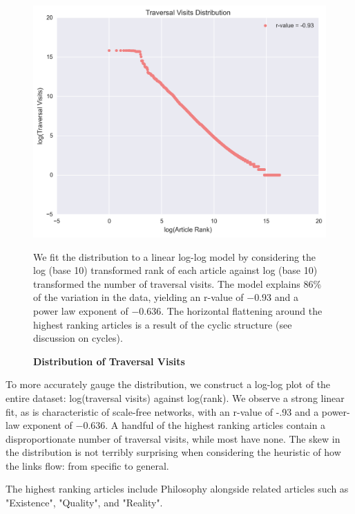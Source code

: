 \documentclass[pre,twocolumn,twoside,superscriptaddress,floatfix, aps, 10pt]{revtex4-1}
\begin{document}
\begin{figure}[tp!]
  \centering	
  \includegraphics[width=\columnwidth]{graphics/traversals_per_article.png} 
  \caption{
    \textbf{Distribution of Traversal Visits}
  }
  We fit the distribution to a linear log-log model by considering the log (base 10) transformed rank of each article against log (base 10) transformed the number of traversal visits. 
  The model explains $86\%$ of the variation in the data, yielding an r-value of $-0.93$ 
  and a power law exponent of $-0.636$. The horizontal flattening around the highest
  ranking articles is a result of the cyclic structure (see discussion on cycles).
  \label{fig:Distribution of Visits}

\end{figure}

To more accurately gauge the distribution, we construct a log-log plot of the entire dataset: log(traversal visits) against log(rank). 
We observe a strong linear fit, as is characteristic of scale-free networks, with an r-value of -.93 and 
a power-law exponent of $-0.636$. A handful of the highest ranking articles contain a disproportionate number of traversal visits, while most have none. The skew in the distribution is not terribly surprising when considering the heuristic of how the links flow: from specific to general. 

The highest ranking articles include Philosophy alongside related articles such as "Existence", "Quality", and "Reality".
\end{document}
